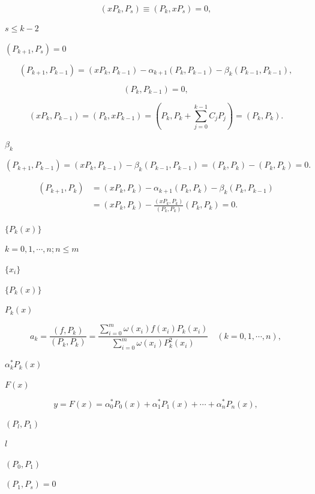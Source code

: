 \documentclass[UTF8,fontset=fandol,a4paper]{ctexart}
\begin{document}
\[
(xP_k,P_s)\equiv(P_k,xP_s)=0,
\]

\noindent $s\leqslant k-2$\par

\noindent $(P_{k+1},P_s)=0$\par

\[
(P_{k+1},P_{k-1})=(xP_k,P_{k-1})-\alpha_{k+1}(P_k,P_{k-1})-\beta_k(P_{k-1},P_{k-1}),\tag{3.6.13}
\]

\[
(P_k,P_{k-1})=0,
\]

\[
(xP_k,P_{k-1})=(P_k,xP_{k-1})=\left(P_k,P_k+\sum_{j=0}^{k-1}C_jP_j\right)=(P_k,P_k).
\]

\noindent $\beta_k$\par

\[
(P_{k+1},P_{k-1})=(xP_k,P_{k-1})-\beta_k(P_{k-1},P_{k-1})=(P_k,P_k)-(P_k,P_k)=0.
\]

\[
\begin{aligned}
(P_{k+1},P_k)&=(xP_k,P_k)-\alpha_{k+1}(P_k,P_k)-\beta_k(P_k,P_{k-1})\\
&=(xP_k,P_k)-\frac{(xP_k,P_k)}{(P_k,P_k)}(P_k,P_k)=0.
\end{aligned}
\]

\noindent $\{P_k(x)\}$\par

\noindent $k=0,1,\cdots,n;n\leqslant m$\par

\noindent $\{x_i\}$\par

\noindent $\{P_k(x)\}$\par

\noindent $P_k(x)$\par

\[
a_k=\frac{(f,P_k)}{(P_k,P_k)}=\frac{\displaystyle\sum_{i=0}^m\omega(x_i)f(x_i)P_k(x_i)}{\displaystyle\sum_{i=0}^m\omega(x_i)P_k^2(x_i)}\quad(k=0,1,\cdots,n),
\]

\noindent $\alpha_k^*P_k(x)$\par

\noindent $F(x)$\par

\[
y=F(x)=\alpha_0^*P_0(x)+\alpha_1^*P_1(x)+\cdots+\alpha_n^*P_n(x),
\]

\noindent $(P_l,P_1)$\par

\noindent $l$\par

\noindent $(P_0,P_1)$\par

\noindent $(P_1,P_s)=0$\par
\end{document}
